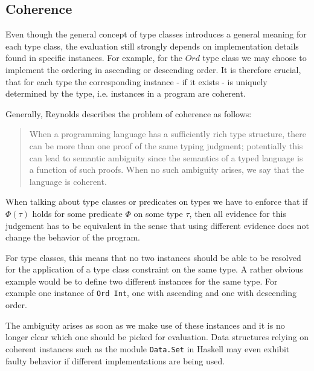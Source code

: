 \subsection{Coherence}\label{sec:coherence}

Even though the general concept of type classes introduces a general meaning for each type class, the evaluation still strongly depends on implementation details found in specific instances.
For example, for the $\mathit{Ord}$ type class we may choose to implement the ordering in ascending or descending order.
It is therefore crucial, that for each type the corresponding instance - if it exists - is uniquely determined by the type, i.e. instances in a program are coherent.

Generally, Reynolds \cite{reynolds_coherence} describes the problem of coherence as follows:

\begin{quote}
  When a programming language has a sufficiently rich type structure, there can be more than one proof of the same
  typing judgment; potentially this can lead to semantic ambiguity since the semantics of a typed language is a function
  of such proofs. When no such ambiguity arises, we say that the language is coherent.
\end{quote}

When talking about type classes or predicates on types we have to enforce that if $\Phi(\tau)$ holds for some predicate $\Phi$ on some type $\tau$,
then all evidence for this judgement has to be equivalent in the sense that using different evidence does not change the behavior of the program.

For type classes, this means that no two instances should be able to be resolved for the application of a type class constraint on the same type.
A rather obvious example would be to define two different instances for the same type.
For example one instance of \texttt{Ord Int}, one with ascending and one with descending order.

The ambiguity arises as soon as we make use of these instances and it is no longer clear which one should be picked for evaluation.
Data structures relying on coherent instances such as the module \texttt{Data.Set} in Haskell may even exhibit faulty behavior if different implementations are being used. \cite{Kilpatrick2019-cy}

